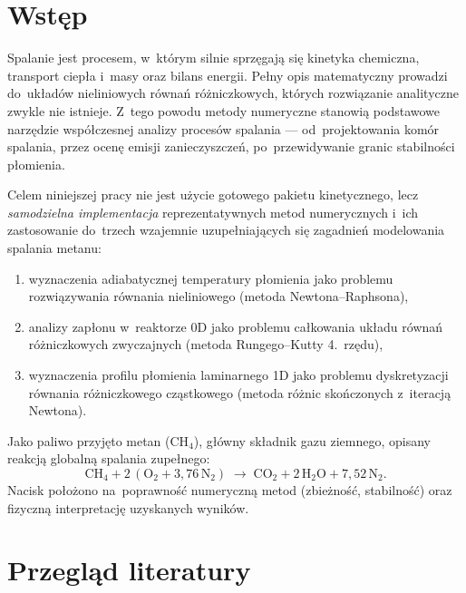 \documentclass[11pt,a4paper]{article}
\begin{document}
\tableofcontents
\newpage

\section{Wstęp}
Spalanie jest procesem, w~którym silnie sprzęgają się kinetyka chemiczna,
transport ciepła i~masy oraz bilans energii. Pełny opis matematyczny prowadzi
do~układów nieliniowych równań różniczkowych, których rozwiązanie analityczne
zwykle nie istnieje. Z~tego powodu metody numeryczne stanowią podstawowe
narzędzie współczesnej analizy procesów spalania --- od~projektowania komór
spalania, przez ocenę emisji zanieczyszczeń, po~przewidywanie granic stabilności
płomienia.

Celem niniejszej pracy nie jest użycie gotowego pakietu kinetycznego, lecz
\emph{samodzielna implementacja} reprezentatywnych metod numerycznych i~ich
zastosowanie do~trzech wzajemnie uzupełniających się zagadnień modelowania
spalania metanu:
\begin{enumerate}
  \item wyznaczenia adiabatycznej temperatury płomienia jako problemu
        rozwiązywania równania nieliniowego (metoda Newtona--Raphsona),
  \item analizy zapłonu w~reaktorze 0D jako problemu całkowania układu równań
        różniczkowych zwyczajnych (metoda Rungego--Kutty 4.~rzędu),
  \item wyznaczenia profilu płomienia laminarnego 1D jako problemu
        dyskretyzacji równania różniczkowego cząstkowego (metoda różnic
        skończonych z~iteracją Newtona).
\end{enumerate}
Jako paliwo przyjęto metan (CH$_4$), główny składnik gazu ziemnego, opisany
reakcją globalną spalania zupełnego:
\begin{equation}
  \mathrm{CH_4} + 2\,(\mathrm{O_2} + 3{,}76\,\mathrm{N_2})
  \;\longrightarrow\; \mathrm{CO_2} + 2\,\mathrm{H_2O} + 7{,}52\,\mathrm{N_2}.
  \label{eq:global}
\end{equation}
Nacisk położono na~poprawność numeryczną metod (zbieżność, stabilność) oraz
fizyczną interpretację uzyskanych wyników.

\section{Przegląd literatury}
\end{document}
